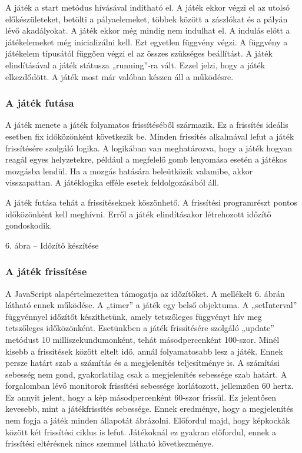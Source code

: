 \documentclass[]{article}
\begin{document}
A játék a start metódus hívásával indítható el. A játék ekkor végzi el
az utolsó előkészületeket, betölti a pályaelemeket, többek között a
zászlókat és a pályán lévő akadályokat. A játék ekkor még mindig nem
indulhat el. A indulás előtt a játékelemeket még inicializálni kell. Ezt
egyetlen függvény végzi. A függvény a játékelem típusától függően végzi
el az összes szükséges beállítást. A játék elindításával a játék
státusza „running''-ra vált. Ezzel jelzi, hogy a játék elkezdődött. A
játék most már valóban készen áll a működésre.

\hypertarget{a-juxe1tuxe9k-futuxe1sa}{%
\subsubsection{A játék futása}\label{a-juxe1tuxe9k-futuxe1sa}}

A játék menete a játék folyamatos frissítéséből származik. Ez a
frissítés ideális esetben fix időközönként következik be. Minden
frissítés alkalmával lefut a játék frissítésére szolgáló logika. A
logikában van meghatározva, hogy a játék hogyan reagál egyes
helyzetekre, például a megfelelő gomb lenyomása esetén a játékos
mozgásba lendül. Ha a mozgás hatására beleütközik valamibe, akkor
visszapattan. A játéklogika efféle esetek feldolgozásából áll.

A játék futása tehát a frissítéseknek köszönhető. A frissítési
programrészt pontos időközönként kell meghívni. Erről a játék
elindításakor létrehozott időzítő gondoskodik.

6. ábra -- Időzítő készítése

\hypertarget{a-juxe1tuxe9k-frissuxedtuxe9se}{%
\subsubsection{A játék
frissítése}\label{a-juxe1tuxe9k-frissuxedtuxe9se}}

A JavaScript alapértelmezetten támogatja az időzítőket. A mellékelt 6.
ábrán látható ennek működése. A „timer'' a játék egy belső objektuma. A
„setInterval'' függvénnyel időzítőt készíthetünk, amely tetszőleges
függvényt hív meg tetszőleges időközönként. Esetünkben a játék
frissítésére szolgáló „update'' metódust 10 milliszekundumonként, tehát
másodpercenként 100-szor. Minél kisebb a frissítések között eltelt idő,
annál folyamatosabb lesz a játék. Ennek persze határt szab a számítás és
a megjelenítés teljesítménye is. A számítási sebesség nem gond,
gyakorlatilag csak a megjelenítés sebessége szab határt. A forgalomban
lévő monitorok frissítési sebessége korlátozott, jellemzően 60 hertz. Ez
annyit jelent, hogy a kép másodpercenként 60-szor frissül. Ez jelentősen
kevesebb, mint a játékfrissítés sebessége. Ennek eredménye, hogy a
megjelenítés nem fogja a játék minden állapotát ábrázolni. Előfordul
majd, hogy képkockák között két frissítési ciklus is lefut. Játékoknál
ez gyakran előfordul, ennek a frissítési eltérésnek nincs szemmel
látható következménye.
\end{document}
